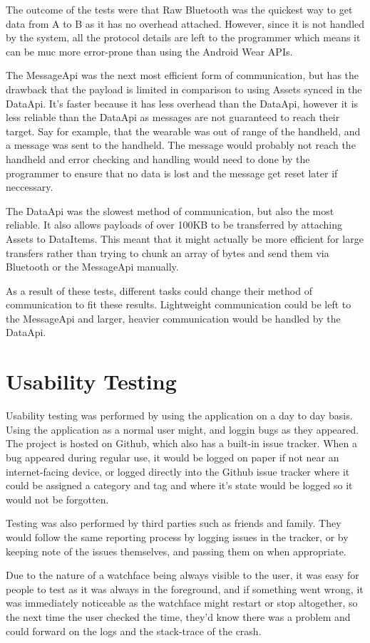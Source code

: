 The outcome of the tests were that Raw Bluetooth was the quickest way to get
data from A to B as it has no overhead attached. However, since it is not
handled by the system, all the protocol details are left to the programmer which
means it can be muc more error-prone than using the Android Wear APIs.

The MessageApi was the next most efficient form of communication, but has the
drawback that the payload is limited in comparison to using Assets synced in the
DataApi. It's faster because it has less overhead than the DataApi, however it
is less reliable than the DataApi as messages are not guaranteed to reach their
target. Say for example, that the wearable was out of range of the handheld, and
a message was sent to the handheld. The message would probably not reach the
handheld and error checking and handling would need to done by the programmer to
ensure that no data is lost and the message get reset later if neccessary.

The DataApi was the slowest method of communication, but also the most reliable.
It also allows payloads of over 100KB to be transferred by attaching Assets to
DataItems. This meant that it might actually be more efficient for large
transfers rather than trying to chunk an array of bytes and send them via
Bluetooth or the MessageApi manually.

As a result of these tests, different tasks could change their method of
communication to fit these results. Lightweight communication could be left to 
the MessageApi and larger, heavier communication would be handled by the
DataApi.

\section{Usability Testing}
Usability testing was performed by using the application on a day to day basis.
Using the application as a normal user might, and loggin bugs as they appeared.
The project is hosted on Github, which also has a built-in issue tracker. When
a bug appeared during regular use, it would be logged on paper if not near an
internet-facing device, or logged directly into the Github issue tracker where
it could be assigned a category and tag and where it's state would be logged so
it would not be forgotten.

Testing was also performed by third parties such as friends and family. They
would follow the same reporting process by logging issues in the tracker, or
by keeping note of the issues themselves, and passing them on when appropriate.

Due to the nature of a watchface being always visible to the user, it was easy
for people to test as it was always in the foreground, and if something went
wrong, it was immediately noticeable as the watchface might restart or stop
altogether, so the next time the user checked the time, they'd know there was
a problem and could forward on the logs and the stack-trace of the crash.
